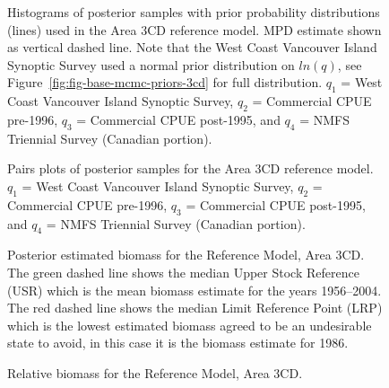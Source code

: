 \documentclass[11pt]{book}
\begin{document}
\begin{figure}[htb]

{\centering {} 

}

\caption{Histograms of posterior samples with prior probability distributions (lines) used in the Area 3CD reference model. MPD estimate shown as vertical dashed line. Note that the West Coast Vancouver Island Synoptic Survey used a normal prior distribution on \(ln(q)\), see Figure~\ref{fig:fig-base-mcmc-priors-3cd} for full distribution. $q_1$ = West Coast Vancouver Island Synoptic Survey, $q_2$ = Commercial CPUE pre-1996, $q_3$ = Commercial CPUE post-1995, and $q_4$ = NMFS Triennial Survey (Canadian portion).}\label{fig:fig-base-mcmc-priors-posts-3cd}
\end{figure}
\begin{figure}[htb]

{\centering {} 

}

\caption{Pairs plots of posterior samples for the Area 3CD reference model. $q_1$ = West Coast Vancouver Island Synoptic Survey, $q_2$ = Commercial CPUE pre-1996, $q_3$ = Commercial CPUE post-1995, and $q_4$ = NMFS Triennial Survey (Canadian portion).}\label{fig:fig-base-mcmc-pairs-3cd}
\end{figure}
\begin{figure}[htb]

{\centering {} 

}

\caption{Posterior estimated biomass for the Reference Model, Area 3CD. The green dashed line shows the median Upper Stock Reference (USR) which is the mean biomass estimate for the years 1956--2004. The red dashed line shows the median Limit Reference Point (LRP) which is the lowest estimated biomass agreed to be an undesirable state to avoid, in this case it is the biomass estimate for 1986.}\label{fig:fig-base-biomass-3cd}
\end{figure}
\begin{figure}[htb]

{\centering {} 

}

\caption{Relative biomass for the Reference Model, Area 3CD.}\label{fig:fig-base-depl-3cd}
\end{figure}
\end{document}
